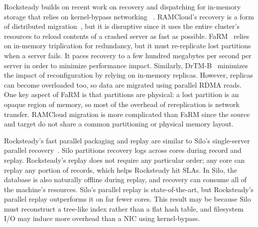 Rocksteady builds on recent work on recovery and dispatching for
in-memory storage that relies on kernel-bypass networking
~\cite{mica,herd,billions,fasst-2016,rdma-guidelines,ix,arrakis,grappa}.  RAMCloud's
recovery is a form of distributed migration~\cite{ramcloud-recovery},
but
it is disruptive since it uses the entire cluster's resources
to reload contents of a crashed server as fast as possible.
FaRM~\cite{farm-2014,farm-txns} relies on in-memory triplication for redundancy, but
it must re-replicate lost partitions when a server fails. It paces recovery to a
few hundred megabytes per second per server in order to minimize performance
impact. Similarly, DrTM-B~\cite{drtmb} minimizes the impact of reconfiguration by relying on in-memory replicas.
However, replicas can become overloaded too, so
data are migrated using parallel RDMA reads.
One key aspect of FaRM is that partitions are physical: a lost
partition is an opaque region of memory, so most of the overhead of
rereplication is network transfer. RAMCloud migration is more
complicated than FaRM since
the source and target do not share a common partitioning or physical memory layout.

Rocksteady's fast parallel packaging and replay are similar to Silo's
single-server parallel recovery~\cite{silo,silor}. Silo partitions recovery logs
across cores during record and replay.  Rocksteady's replay does not
require any particular order; any core can replay any portion of records,
which helps Rocksteady hit SLAs.  In Silo, the database is also
naturally offline during replay, and recovery can consume all of the
machine's resources. Silo's parallel replay is state-of-the-art, but Rocksteady's
parallel replay outperforms it on far fewer cores. This result may be because Silo
must reconstruct a tree-like index rather than a flat hash table, and
filesystem I/O may induce more overhead than a NIC using kernel-bypass.

%
%


